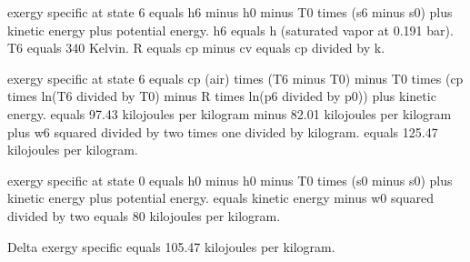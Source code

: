 exergy specific at state 6 equals h6 minus h0 minus T0 times (s6 minus s0) plus kinetic energy plus potential energy.  
h6 equals h (saturated vapor at 0.191 bar).  
T6 equals 340 Kelvin.  
R equals cp minus cv equals cp divided by k.  

exergy specific at state 6 equals cp (air) times (T6 minus T0) minus T0 times (cp times ln(T6 divided by T0) minus R times ln(p6 divided by p0)) plus kinetic energy.  
equals 97.43 kilojoules per kilogram minus 82.01 kilojoules per kilogram plus w6 squared divided by two times one divided by kilogram.  
equals 125.47 kilojoules per kilogram.  

exergy specific at state 0 equals h0 minus h0 minus T0 times (s0 minus s0) plus kinetic energy plus potential energy.  
equals kinetic energy minus w0 squared divided by two equals 80 kilojoules per kilogram.  

Delta exergy specific equals 105.47 kilojoules per kilogram.